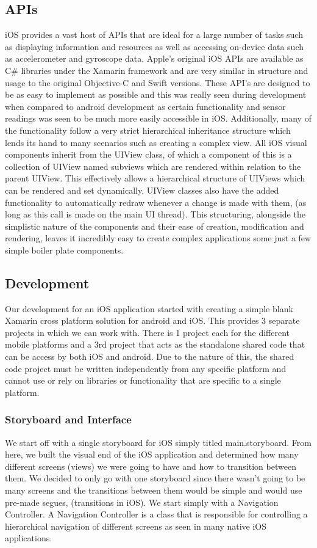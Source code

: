 \documentclass[main.tex]{subfiles}
\begin{document}
\subsection{APIs}
iOS provides a vast host of APIs that are ideal for a large number of tasks such as displaying information and resources as well as accessing on-device data such as accelerometer and gyroscope data. Apple’s original iOS APIs are available as C# libraries under the Xamarin framework and are very similar in structure and usage to the original Objective-C and Swift versions. These API’s are designed to be as easy to implement as possible and this was really seen during development when compared to android development as certain functionality and sensor readings was seen to be much more easily accessible in iOS. Additionally, many of the functionality follow a very strict hierarchical inheritance structure which lends its hand to many scenarios such as creating a complex view. All iOS visual components inherit from the UIView class, of which a component of this is a collection of UIView named subviews which are rendered within relation to the parent UIView. This effectively allows a hierarchical structure of UIViews which can be rendered and set dynamically. UIView classes also have the added functionality to automatically redraw whenever a change is made with them, (as long as this call is made on the main UI thread). This structuring, alongside the simplistic nature of the components and their ease of creation, modification and rendering, leaves it incredibly easy to create complex applications some just a few simple boiler plate components.

\subsection{Development}

Our development for an iOS application started with creating a simple blank Xamarin cross platform solution for android and iOS. This provides 3 separate projects in which we can work with. There is 1 project each for the different mobile platforms and a 3rd project that acts as the standalone shared code that can be access by both iOS and android. Due to the nature of this, the shared code project must be written independently from any specific platform and cannot use or rely on libraries or functionality that are specific to a single platform.

\subsubsection{Storyboard and Interface}
We start off with a single storyboard for iOS simply titled main.storyboard. From here, we built the visual end of the iOS application and determined how many different screens (views) we were going to have and how to transition between them. We decided to only go with one storyboard since there wasn’t going to be many screens and the transitions between them would be simple and would use pre-made segues, (transitions in iOS). We start simply with a Navigation Controller. A Navigation Controller is a class that is responsible for controlling a hierarchical navigation of different screens as seen in many native iOS applications.
\end{document}

